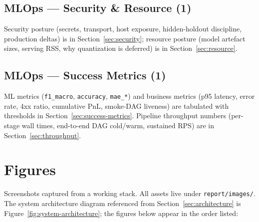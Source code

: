\documentclass[11pt,a4paper]{article}
\begin{document}
\subsection*{MLOps --- Security \& Resource (1)}
Security posture (secrets, transport, host exposure, hidden-holdout discipline, production deltas) is in Section~\ref{sec:security}; resource posture (model artefact sizes, serving RSS, why quantization is deferred) is in Section~\ref{sec:resource}.

\subsection*{MLOps --- Success Metrics (1)}
ML metrics (\texttt{f1\_macro}, \texttt{accuracy}, \texttt{mae\_*}) and business metrics (p95 latency, error rate, 4xx ratio, cumulative PnL, smoke-DAG liveness) are tabulated with thresholds in Section~\ref{sec:success-metrics}. Pipeline throughput numbers (per-stage wall times, end-to-end DAG cold/warm, sustained RPS) are in Section~\ref{sec:throughput}.


\section{Figures}

Screenshots captured from a working stack. All assets live under \texttt{report/images/}. The system architecture diagram referenced from Section~\ref{sec:architecture} is Figure~\ref{fig:system-architecture}; the figures below appear in the order listed:
\end{document}
